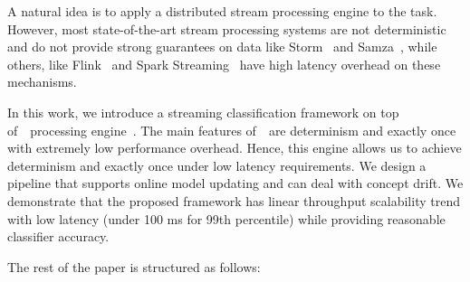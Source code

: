 A natural idea is to apply a distributed stream processing engine to the task. However, most state-of-the-art stream processing systems are not deterministic and do not provide strong guarantees on data like Storm~\cite{apache:storm} and Samza~\cite{Noghabi:2017:SSS:3137765.3137770}, while others, like Flink~\cite{Carbone:2017:SMA:3137765.3137777} and Spark Streaming~\cite{Zaharia:2012:DSE:2342763.2342773} have high latency overhead on these mechanisms. 

In this work, we introduce a streaming classification framework on top of~\FlameStream\ processing engine~\cite{we2018beyondmr, we2018adbis}. The main features of~\FlameStream\ are determinism and exactly once with extremely low performance overhead. Hence, this engine allows us to achieve determinism and exactly once under low latency requirements. We design a pipeline that supports online model updating and can deal with concept drift. We demonstrate that the proposed framework has linear throughput scalability trend with low latency (under 100 ms for 99th percentile) while providing reasonable classifier accuracy.

The rest of the paper is structured as follows:
